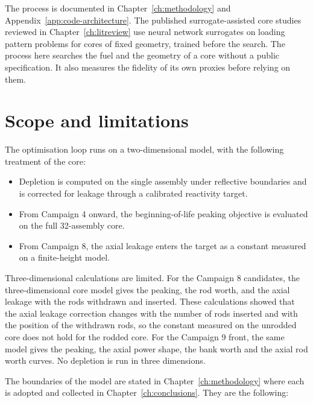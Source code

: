 The process is documented in Chapter~\ref{ch:methodology} and
Appendix~\ref{app:code-architecture}. The published surrogate-assisted core studies reviewed in
Chapter~\ref{ch:litreview} use neural network surrogates on loading
pattern problems for cores of fixed geometry, trained before the
search. The process here searches the fuel and the geometry of a core
without a public specification. It also measures the fidelity of its
own proxies before relying on them.

\section{Scope and limitations}
\label{sec:intro-scope}

The optimisation loop runs on a two-dimensional model, with the
following treatment of the core:

\begin{itemize}
  \item Depletion is computed on the single assembly under reflective
        boundaries and is corrected for leakage through a calibrated
        reactivity target.

  \item From Campaign 4 onward, the beginning-of-life peaking objective
        is evaluated on the full 32-assembly core.

  \item From Campaign 8, the axial leakage enters the target as a
        constant measured on a finite-height model.
\end{itemize}

Three-dimensional calculations are limited. For the Campaign 8 candidates,
the three-dimensional core model gives the peaking, the rod worth, and the
axial leakage with the rods withdrawn and inserted. These calculations
showed that the axial leakage correction changes with the number of rods
inserted and with the position of the withdrawn rods, so the constant
measured on the unrodded core does not hold for the rodded core. For the
Campaign 9 front, the same model gives the peaking, the axial power shape,
the bank worth and the axial rod worth curves. No depletion is run in
three dimensions.

The boundaries of the model are stated in Chapter~\ref{ch:methodology}
where each is adopted and collected in Chapter~\ref{ch:conclusions}.
They are the following:

